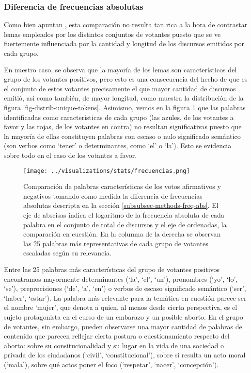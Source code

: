\subsubsection{Diferencia de frecuencias absolutas}
Como bien apuntan \cite{monroe2008fightin}, esta comparación no resulta tan rica
a la hora de contrastar lemas empleados por los distintos conjuntos de
votantes puesto que se ve fuertemente influenciada por la cantidad y longitud
de los discursos emitidos por cada grupo.
\par
En nuestro caso, se observa que la mayor\'ia de los lemas son característicos
del grupo de los votantes positivos, pero esto es una consecuencia del hecho
de que es el conjunto de estos votantes precisamente el que mayor cantidad de
discursos emitió, así como también, de mayor longitud, como muestra la distribución
de la figura \ref{fig-distrib-unique-tokens}. Asimismo, vemos en la figura
\ref{fig-statistics-freq-abs} que las palabras identificadas como características
de cada grupo (las azules, de los votantes a favor y las rojas, de los votantes
en contra) no resultan significativas puesto que la mayoría de ellas constituyen
palabras con escaso o nulo significado semántico (son verbos como `tener' o
determinantes, como `el' o `la'). Esto se evidencia sobre todo en el caso de
los votantes a favor.

\begin{figure}[h!]
    \centering
    \texttt{[image: ../visualizations/stats/frecuencias.png]}
    \caption{Comparación de palabras características de los votos afirmativos y
    negativos tomando como medida la diferencia de frecuencias absolutas descripta
    en la sección \ref{subsubsec-methods-freq-abs}. El eje de abscisas indica el
    logaritmo de la frecuencia absoluta de cada palabra en el conjunto de total
    de discursos y el eje de ordenadas, la comparación en cuestión. En la
    columna de la derecha se observan las 25 palabras más representativas de
    cada grupo de votantes escaladas según su relevancia.}
    \label{fig-statistics-freq-abs}
\end{figure}

Entre las 25 palabras más características del grupo de votantes positivos
encontramos mayormente determinantes (`la', `el', `un'), pronombres 
(`yo', `lo', `se'), preprocisiones (`de', `a', `en') o verbos de escaso
significado semántico (`ser', `haber', `estar'). La palabra más relevante
para la temática en cuestión parece ser el nombre `mujer', que denota a
quien, al menos desde cierta perspectiva, es el
sujeto protagonista en el curso de un embarazo y un posible aborto. En el grupo
de votantes, sin embargo, pueden observarse una mayor cantidad de palabras
de contenido que parecen reflejar cierta
postura o cuestionamiento respecto del aborto: sobre su consitucionalidad
y su lugar en la vida de una sociedad o privada de los ciudadanos
(`civil', `constitucional'), sobre si resulta un acto moral (`mala'),
sobre qué actos poner el foco (`respetar', `nacer', `concepción').


